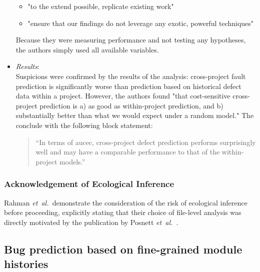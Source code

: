 \documentclass{sig-alternate-05-2015}
\newcommand{\etal}{\mbox{\emph{et al.\ }}}
\begin{document}
\begin{itemize}
	\begin{itemize}
		\item "to the extend possible, replicate existing work"
		\item "ensure that our findings do not leverage any exotic, powerful techniques"
	\end{itemize}
Because they were measuring performance and not testing any hypotheses, the authors simply used all available variables.
\item \emph{Results}: \\
Suspicions were confirmed by the results of the analysis: cross-project fault prediction is significantly worse than prediction based on historical defect data within a project. However, the authors found "that cost-sensitive cross-project prediction is a) as good as within-project prediction, and b) substantially better than what we would expect under a random model." The conclude with the following block statement:
\blockquote{\enquote{In terms of aucec, cross-project defect prediction performs surprisingly well and may have a comparable performance to that of the within-project models.}}
\end{itemize}

\subsubsection{Acknowledgement of Ecological Inference}
Rahman \etal demonstrate the consideration of the risk of ecological inference before proceeding, explicitly stating that their choice of file-level analysis was directly motivated by the publication by Posnett \etal.

\subsection{Bug prediction based on fine-grained module histories \cite{Hata:2012}}
\end{document}
